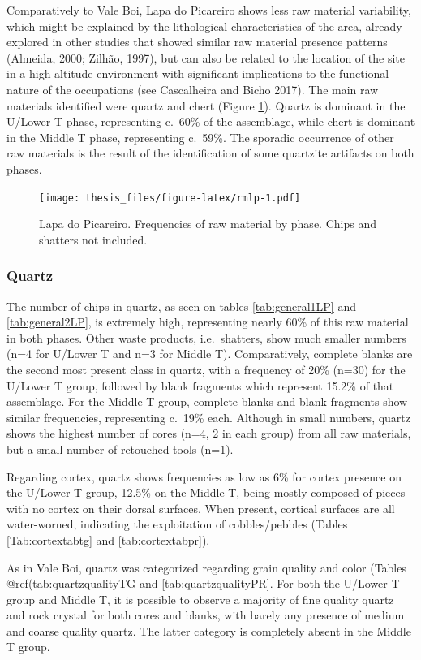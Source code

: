 \documentclass[12pt,twoside]{reedthesis}
\begin{document}
Comparatively to Vale Boi, Lapa do Picareiro shows less raw material variability, which might be explained by the lithological characteristics of the area, already explored in other studies that showed similar raw material presence patterns (Almeida, 2000; Zilhão, 1997), but can also be related to the location of the site in a high altitude environment with significant implications to the functional nature of the occupations (see Cascalheira and Bicho 2017). The main raw materials identified were quartz and chert (Figure \ref{fig:rmlp}). Quartz is dominant in the U/Lower T phase, representing c.~60\% of the assemblage, while chert is dominant in the Middle T phase, representing c.~59\%. The sporadic occurrence of other raw materials is the result of the identification of some quartzite artifacts on both phases.
\begin{figure}
\centering
\texttt{[image: thesis\_files/figure-latex/rmlp-1.pdf]}
\caption{\label{fig:rmlp}Lapa do Picareiro. Frequencies of raw material by phase. Chips and shatters not included.}
\end{figure}
\hypertarget{quartz-1}{%
\subsubsection{Quartz}\label{quartz-1}}

The number of chips in quartz, as seen on tables \ref{tab:general1LP} and \ref{tab:general2LP}, is extremely high, representing nearly 60\% of this raw material in both phases. Other waste products, i.e.~shatters, show much smaller numbers (n=4 for U/Lower T and n=3 for Middle T). Comparatively, complete blanks are the second most present class in quartz, with a frequency of 20\% (n=30) for the U/Lower T group, followed by blank fragments which represent 15.2\% of that assemblage. For the Middle T group, complete blanks and blank fragments show similar frequencies, representing c.~19\% each. Although in small numbers, quartz shows the highest number of cores (n=4, 2 in each group) from all raw materials, but a small number of retouched tools (n=1).

Regarding cortex, quartz shows frequencies as low as 6\% for cortex presence on the U/Lower T group, 12.5\% on the Middle T, being mostly composed of pieces with no cortex on their dorsal surfaces. When present, cortical surfaces are all water-worned, indicating the exploitation of cobbles/pebbles (Tables \ref{Tab:cortextabtg} and \ref{tab:cortextabpr}).

As in Vale Boi, quartz was categorized regarding grain quality and color (Tables @ref(tab:quartzqualityTG and \ref{tab:quartzqualityPR}. For both the U/Lower T group and Middle T, it is possible to observe a majority of fine quality quartz and rock crystal for both cores and blanks, with barely any presence of medium and coarse quality quartz. The latter category is completely absent in the Middle T group.
\end{document}
